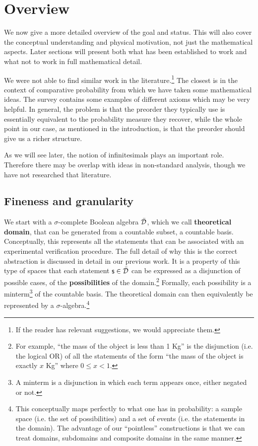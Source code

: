 \documentclass[10pt, onecolumn, longbibliography, nofootinbib]{revtex4-2}
\begin{document}
\section{Overview}

We now give a more detailed overview of the goal and status. This will also cover the conceptual understanding and physical motivation, not just the mathematical aspects. Later sections will present both what has been established to work and what not to work in full mathematical detail.

We were not able to find similar work in the literature.\footnote{If the reader has relevant suggestions, we would appreciate them.} The closest is in the context of comparative probability\cite{definetti, villegas} from which we have taken some mathematical ideas. The survey \cite{fishburnsurvey} contains some examples of different axioms which may be very helpful. In general, the problem is that the preorder they typically use is essentially equivalent to the probability measure they recover, while the whole point in our case, as mentioned in the introduction, is that the preorder should give us a richer structure.

As we will see later, the notion of infinitesimals plays an important role. Therefore there may be overlap with ideas in non-standard analysis, though we have not researched that literature.

\subsection{Fineness and granularity}

We start with a $\sigma$-complete Boolean algebra $\bar{\mathcal{D}}$, which we call \textbf{theoretical domain}, that can be generated from a countable subset, a countable basis. Conceptually, this represents all the statements that can be associated with an experimental verification procedure. The full detail of why this is the correct abstraction is discussed in detail in our previous work.\cite{aop-book} It is a property of this type of spaces that each statement $\mathsf{s} \in \bar{\mathcal{D}}$ can be expressed as a disjunction of possible cases, of the  \textbf{possibilities} of the domain.\footnote{For example, ``the mass of the object is less than 1 Kg'' is the disjunction (i.e. the logical OR) of all the statements of the form ``the mass of the object is exactly $x$ Kg'' where $0 \leq x < 1$.} Formally, each possibility is a minterm\footnote{A minterm is a disjunction in which each term appears once, either negated or not.} of the countable basis. The theoretical domain can then equivalently be represented by a $\sigma$-algebra.\footnote{This conceptually maps perfectly to what one has in probability: a sample space (i.e. the set of possibilities) and a set of events (i.e. the statements in the domain). The advantage of our ``pointless'' constructions is that we can treat domains, subdomains and composite domains in the same manner.}
\end{document}
